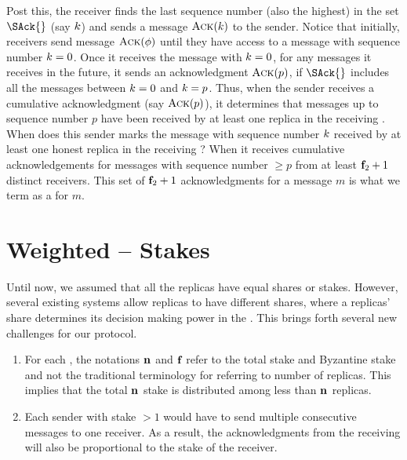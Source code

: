 Post this, the receiver finds the last sequence number (also the highest) in the set $\SAck{}$ (say $k$)
and sends a message $\textsc{Ack}(k)$ to the sender.
Notice that initially, receivers send message $\textsc{Ack}(\phi)$ until they have access to a message with sequence number $k=0$.
Once it receives the message with $k=0$, for any messages it receives in the future, 
it sends an acknowledgment $\textsc{Ack}(p)$, if $\SAck{}$ includes all the messages between $k=0$ and $k=p$.
%
%
Thus, when the sender receives a cumulative acknowledgment (say $\textsc{Ack}(p)$), it determines
that messages up to sequence number $p$ have been received by at least one replica in the receiving \RSM{}.
When does this sender marks the message with sequence number $k$ 
received by at least one honest replica in the receiving \RSM{}? 
When it receives cumulative acknowledgements for messages with sequence number $\ge p$
from at least $\textbf{f}_{2}+1$ distinct receivers.
This set of $\textbf{f}_{2}+1$ acknowledgments for a message $m$ is what we term as a \quack{} for $m$.




\section{Weighted  -- Stakes}
\label{s:stake}
Until now, we assumed that all the replicas have equal shares or stakes. 
However, several existing systems allow replicas to have different shares, 
where a replicas' share determines its decision making power in the \RSM{}.
This brings forth several new challenges for our \Scrooge{} protocol.
\begin{enumerate}
    \item For each \RSM{}, the notations $\textbf{n}_{}$ and $\textbf{f}_{}$ refer to the total 
    stake and Byzantine stake and not the traditional terminology for referring to 
    number of replicas.
    This implies that the total $\textbf{n}_{}$ stake is distributed among less than $\textbf{n}_{}$ replicas.

    \item Each sender with stake $> 1$ would have to send multiple consecutive messages 
    to one receiver.
    As a result, the acknowledgments from the receiving \RSM{} will also be proportional 
    to the stake of the receiver.

\end{enumerate}

